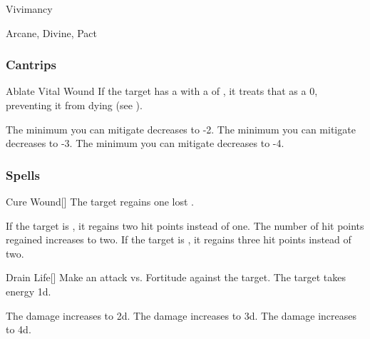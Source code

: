 \newpage
\begin{spellsection}{Vivimancy}

\begin{spellheader}
\end{spellheader}


 Arcane, Divine, Pact

\subsubsection{Cantrips}


\begin{freeability}{Ablate Vital Wound}
If the target has a  with a  of , it treats that  as a 0, preventing it from dying (see ).

\rankline
{} The minimum  you can mitigate decreases to -2.
 The minimum  you can mitigate decreases to -3.
 The minimum  you can mitigate decreases to -4.
\end{freeability}

\end{spellsection}


\subsubsection{Spells}


\lowercase{\hypertarget{spell:Cure Wound}{}}\label{spell:Cure Wound}
\begin{freeability}[Rank 1]{\hypertarget{spell:Cure Wound}{Cure Wound}}[]
The target regains one lost .

\rankline
{} If the target is , it regains two hit points instead of one.
 The number of hit points regained increases to two.
 If the target is , it regains three hit points instead of two.
\end{freeability}
\vspace{0.25em}



\lowercase{\hypertarget{spell:Drain Life}{}}\label{spell:Drain Life}
\begin{freeability}[Rank 1]{\hypertarget{spell:Drain Life}{Drain Life}}[]
Make an attack vs. Fortitude against the target.
\hit The target takes energy  \plus1d.

\rankline
{} The damage increases to  \plus2d.
 The damage increases to  \plus3d.
 The damage increases to  \plus4d.
\end{freeability}
\vspace{0.25em}



